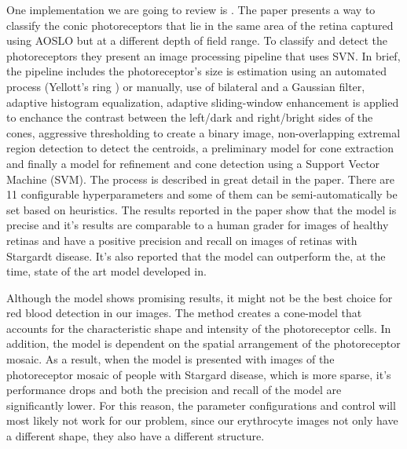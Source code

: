 \documentclass[]{article}
\begin{document}
One implementation we are going to review is \cite{bergeles_unsupervised_2017}. 
The paper presents a way to classify the conic photoreceptors that lie in the same area of the retina captured using AOSLO but at a different depth of field range.
To classify and detect the photoreceptors they present an image processing pipeline that uses SVN.
In brief, the pipeline includes the photoreceptor's size is estimation using an automated process (Yellott's ring\cite{cunefare_automatic_2016} \cite{cooper_automatic_2013}) or manually, use of bilateral and a Gaussian filter, adaptive histogram equalization, adaptive sliding-window enhancement is applied to enchance the contrast between the left/dark and right/bright sides of the cones, aggressive thresholding to create a binary image, non-overlapping extremal region detection to detect the centroids, a preliminary model for cone extraction and finally a model for refinement and cone detection using a Support Vector Machine (SVM). 
The process is described in great detail in the paper.
There are 11 configurable hyperparameters and some of them can be semi-automatically be set based on heuristics.
The results reported in the paper show that the model is precise and it's results are comparable to a human grader for images of healthy retinas and have a positive precision and recall on images of retinas with Stargardt disease.
It's also reported that the model can outperform the, at the time, state of the art model developed in\cite{cunefare_automatic_2016}.

Although the model shows promising results, it might not be the best choice for red blood detection in our images. 
The method creates a cone-model that accounts for the characteristic shape and intensity of the photoreceptor cells.
In addition, the model is dependent on the spatial arrangement of the photoreceptor mosaic. 
As a result, when the model is presented with images of the photoreceptor mosaic of people with Stargard disease, which is more sparse, it's performance drops and both the precision and recall of the model are significantly lower.
For this reason, the parameter configurations and control will most likely not work for our problem, since our erythrocyte images not only have a different shape, they also have a different structure.
\end{document}
